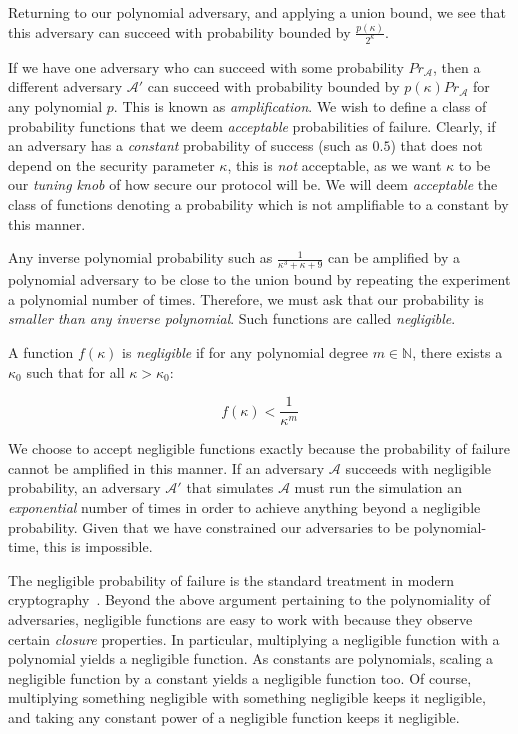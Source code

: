Returning to our polynomial adversary, and applying a union bound, we see that
this adversary can succeed with probability bounded by $\frac{p(\kappa)}{2^\kappa}$.

If we have one adversary who can succeed with some probability $Pr_\mathcal{A}$,
then a different adversary $\mathcal{A}'$ can succeed with probability
bounded by $p(\kappa) Pr_{\mathcal{A}}$ for any polynomial $p$. This is known as
\emph{amplification}.
We wish to define a class of probability functions that we deem \emph{acceptable}
probabilities of failure. Clearly, if an adversary has a \emph{constant} probability of success
(such as $0.5$) that does not depend on the security parameter $\kappa$, this is \emph{not}
acceptable, as we want $\kappa$ to be our \emph{tuning knob} of how secure our protocol will be.
We will deem \emph{acceptable} the class of functions denoting a probability which is not
amplifiable to a constant by this manner.

Any inverse polynomial probability such as $\frac{1}{\kappa^3 + \kappa + 9}$ can be amplified by a
polynomial adversary to be close to the union bound by repeating the experiment a polynomial
number of times. Therefore, we must ask that our probability is \emph{smaller than any inverse
polynomial}. Such functions are called \emph{negligible}.

\begin{definition}
  A function $f(\kappa)$ is \emph{negligible} if for any polynomial degree
  $m \in \mathbb{N}$, there exists a $\kappa_0$ such that for all
  $\kappa > \kappa_0$:

  \[
    f(\kappa) < \frac{1}{\kappa^m}
  \]
\end{definition}

We choose to accept negligible functions exactly because the probability of failure
cannot be amplified in this manner. If an adversary $\mathcal{A}$ succeeds with negligible
probability, an adversary $\mathcal{A}'$ that simulates $\mathcal{A}$ must run the
simulation an \emph{exponential} number of times in order to achieve anything beyond
a negligible probability. Given that we have constrained our adversaries to be polynomial-time,
this is impossible.

The negligible probability of failure is the standard treatment in modern cryptography~\cite{katz}.
Beyond the above argument pertaining to the polynomiality of adversaries, negligible
functions are easy to work with because they observe certain \emph{closure} properties.
In particular, multiplying a negligible function with a polynomial yields a negligible
function. As constants are polynomials, scaling a negligible function by a constant
yields a negligible function too. Of course, multiplying something negligible with
something negligible keeps it negligible, and taking any constant power of a negligible function
keeps it negligible.

